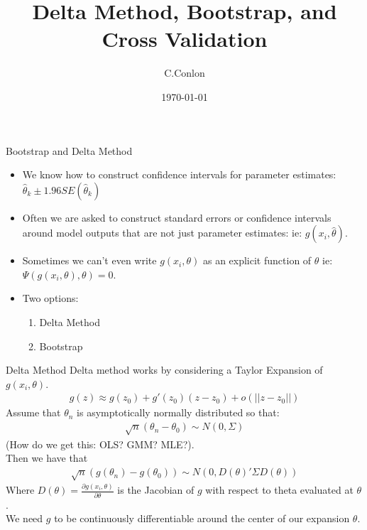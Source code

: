 \documentclass[11pt,handout,xcolor=pdftex,dvipsnames,table,mathserif,aspectratio=169]{beamer}
\title [Bootstrap]{Delta Method, Bootstrap, and Cross Validation}
\author{C.Conlon}
\institute{Applied Econometrics II}
\date{\today}
\begin{document}
\begin{frame}
\titlepage
\end{frame}


\begin{frame}{Bootstrap and Delta Method}
\begin{itemize}
\item We know how to construct confidence intervals for parameter estimates:  $\hat{\theta}_k \pm 1.96 SE(\hat{\theta}_k)$
\item Often we are asked to construct standard errors or confidence intervals around model outputs that are not just parameter estimates: ie:  $g(x_i,\hat{\theta})$.
\item Sometimes we can't even write $g(x_i,\theta)$ as an explicit function of $\theta$ ie: $\Psi(g(x_i,\theta),\theta) = 0$.
\item Two options:
\begin{enumerate}
\item Delta Method
\item Bootstrap
\end{enumerate}
\end{itemize}
\end{frame}

\begin{frame}{Delta Method}
Delta method works by considering a \alert{Taylor Expansion} of $g(x_i,\theta)$.
\begin{eqnarray*}
g(z) \approx g(z_0) + g'(z_0)(z-z_0) + o(||z-z_0||)
\end{eqnarray*}
Assume that $\theta_n$ is asymptotically normally distributed so that:
\begin{eqnarray*}
\sqrt{n} (\theta_n - \theta_0) \sim N(0,\Sigma)
\end{eqnarray*}
(How do we get this: OLS? GMM? MLE?).\\

Then we have that 
\begin{eqnarray*}
\sqrt{n} (g(\theta_n) - g(\theta_0)) \sim N(0,D(\theta)' \Sigma  D(\theta))
\end{eqnarray*}
Where $D(\theta) = \frac{\partial g(x_i, \theta)}{\partial \theta}$ is the Jacobian of $g$ with respect to theta evaluated at $\theta$.\\
We need $g$ to be continuously differentiable around the center of our expansion $\theta$.
\end{frame}
\end{document}
